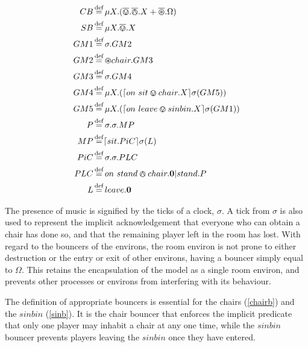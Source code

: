 \begin{table}[h]
  \caption{Summary of Processes and Derived Syntax for Musical Chairs}
  \label{tab:musicalchairs}
  \shrule
  \begin{align}
   CB &
    \operatorname{\stackrel{\textrm{def}}{=}} 
    \mu X.(\overline{\varovee}.\overline{\varowedge}.X + \overline{\varoast}.\Omega) \label{chairb} \\
   SB &
    \operatorname{\stackrel{\textrm{def}}{=}} 
    \mu X.\overline{\varovee}.X \label{sinb} \\
   GM1 &
    \operatorname{\stackrel{\textrm{def}}{=}} 
    \sigma.GM2 \label{gmstage2} \\
    GM2 &
    \operatorname{\stackrel{\textrm{def}}{=}} 
    \varoast chair.GM3 \label{gmstage3} \\
   GM3 &
   \operatorname{\stackrel{\textrm{def}}{=}}
   \sigma.GM4 \label{gmstage4} \\
   GM4 &
    \operatorname{\stackrel{\textrm{def}}{=}}  
    \mu X.(\lceil{on\ sit \varovee chair.X}\rceil {\sigma} ({GM5})) \label{gmstage5} \\
   GM5 &
    \operatorname{\stackrel{\textrm{def}}{=}} 
    \mu X.(\lceil{on\ leave \varovee sinbin.X}\rceil {\sigma} ({GM1})) \label{gmstage6}\\
    P &
    \operatorname{\stackrel{\textrm{def}}{=}} 
    \sigma.\sigma.MP \label{player} \\
    MP &
    \operatorname{\stackrel{\textrm{def}}{=}}
    \lceil{sit.PiC}\rceil {\sigma} ({L}) \label{mplayer}\\
   PiC &
    \operatorname{\stackrel{\textrm{def}}{=}} 
    \sigma.\sigma.PLC \label{pinchair} \\
   PLC &
   \operatorname{\stackrel{\textrm{def}}{=}}
   on\ stand \varowedge chair.\textbf{0}|stand.P \label{pleavechair} \\
   L &
    \operatorname{\stackrel{\textrm{def}}{=}} 
    leave.\textbf{0} \label{loser} 
  \end{align}
  \shrule
\end{table}

The presence of music is signified by the ticks of a clock, $\sigma$.  A
tick from $\sigma$ is also used to represent the implicit
acknowledgement that everyone who can obtain a chair has done so, and
that the remaining player left in the room has lost.  With regard to the
bouncers of the environs, the room environ is not prone to either
destruction or the entry or exit of other environs, having a bouncer
simply equal to $\Omega$.  This retains the encapsulation of the model
as a single room environ, and prevents other processes or environs
from interfering with its behaviour.

The definition of appropriate bouncers is essential for the chairs
(\ref{chairb}) and the $sinbin$ (\ref{sinb}).  It is the chair bouncer
that enforces the implicit predicate that only one player may inhabit a
chair at any one time, while the $sinbin$ bouncer prevents players
leaving the $sinbin$ once they have entered.

